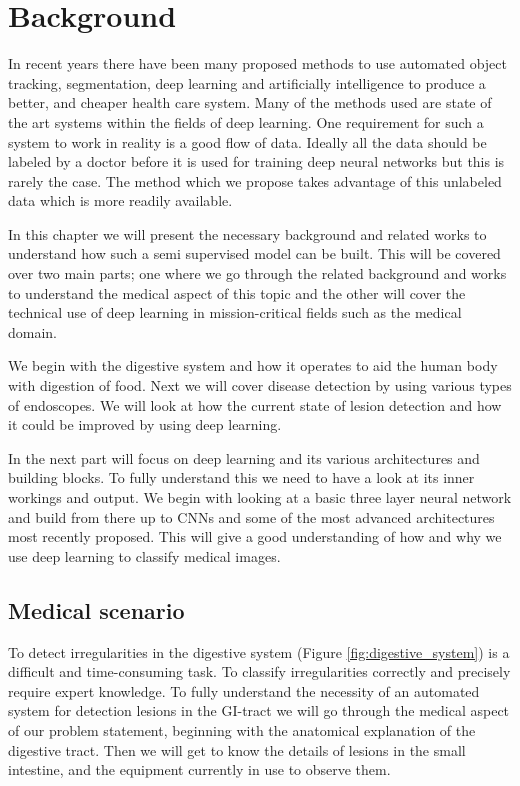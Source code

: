 \documentclass[thesis.tex]{subfiles}
\begin{document}
\chapter{Background} \label{chap:background}
In recent years there have been many proposed methods to use automated object tracking, segmentation, deep learning and artificially intelligence to produce a better, and cheaper health care system. Many of the methods used are state of the art systems within the fields of deep learning. One requirement for such a system to work in reality is a good flow of data. Ideally all the data should be labeled by a doctor before it is used for training deep neural networks but this is rarely the case. The method which we propose takes advantage of this unlabeled data which is more readily available.

In this chapter we will present the necessary background and related works to understand how such a semi supervised model can be built. This will be covered over two main parts; one where we go through the related background and works to understand the medical aspect of this topic and the other will cover the technical use of deep learning in mission-critical fields such as the medical domain.

We begin with the digestive system and how it operates to aid the human body with digestion of food. Next we will cover disease detection by using various types of endoscopes. We will look at how the current state of lesion detection and how it could be improved by using deep learning. 

In the next part will focus on deep learning and its various architectures and building blocks. To fully understand this we need to have a look at its inner workings and output. We begin with looking at a basic three layer neural network and build from there up to CNNs and some of the most advanced architectures most recently proposed. This will give a good understanding of how and why we use deep learning to classify medical images.





\section{Medical scenario} \label{sec:medical_scenario}
To detect irregularities in the digestive system (Figure \ref{fig:digestive_system}) is a difficult and time-consuming task. To classify irregularities correctly and precisely require expert knowledge. To fully understand the necessity of an automated system for detection lesions in the GI-tract we will go through the medical aspect of our problem statement, beginning with the anatomical explanation of the digestive tract. Then we will get to know the details of lesions in the small intestine, and the equipment currently in use to observe them.
\end{document}
